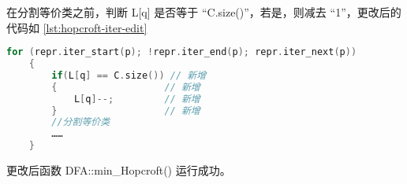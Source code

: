 在分割等价类之前，判断 L[q] 是否等于 “C.size()”，若是，则减去 “1”，更改后的代码如 \ref{lst:hopcroft-iter-edit}

\lstset{style=mystyle}
\begin{lstlisting}[language=C++,label={lst:hopcroft-iter-edit},caption={ min-hop.cpp },firstnumber=100]
    for (repr.iter_start(p); !repr.iter_end(p); repr.iter_next(p))
    {
        if(L[q] == C.size()) // 新增
        {                   // 新增
            L[q]--;         // 新增
        }                   // 新增
        //分割等价类
        ……
    }
\end{lstlisting}

更改后函数 DFA::min\_Hopcroft() 运行成功。
